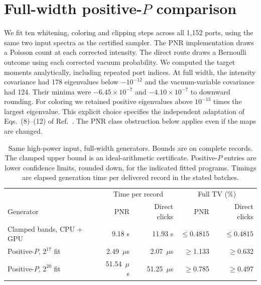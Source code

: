 \documentclass[11pt]{article}
\begin{document}
\section{Full-width positive-$P$ comparison}\label{sec:fullpositive}
We fit ten whitening, coloring and clipping steps across all 1,152 ports, using the same two input spectra as the certified sampler. The PNR implementation draws a Poisson count at each corrected intensity. The direct route draws a Bernoulli outcome using each corrected vacuum probability. We computed the target moments analytically, including repeated port indices. At full width, the intensity covariance had 178 eigenvalues below $-10^{-12}$ and the vacuum-variable covariance had 124. Their minima were $-6.45\times10^{-7}$ and $-4.10\times10^{-7}$ to downward rounding. For coloring we retained positive eigenvalues above $10^{-13}$ times the largest eigenvalue. This explicit choice specifies the independent adaptation of Eqs.~(8)--(12) of Ref.~\cite{goodman}. The PNR class obstruction below applies even if the maps are changed.

\begin{table}[ht]
\centering\small
\caption{Same high-power input, full-width generators. Bounds are on complete records. The clamped upper bound is an ideal-arithmetic certificate. Positive-$P$ entries are lower confidence limits, rounded down, for the indicated fitted programs. Timings are elapsed generation time per delivered record in the stated batches.}
\begin{tabular}{lrrrr}
\toprule
& \multicolumn{2}{c}{Time per record} & \multicolumn{2}{c}{Full TV (\%)}\\
Generator & PNR & Direct clicks & PNR & Direct clicks\\
\midrule
Clamped bands, CPU + GPU & 9.18 s & 11.93 s & $\le0.4815$ & $\le0.4815$\\
Positive-$P$, $2^{17}$ fit & 2.49~$\mu$s & 2.07~$\mu$s & $\ge$1.133 & $\ge$0.632\\
Positive-$P$, $2^{20}$ fit & 51.54~$\mu$s & 51.25~$\mu$s & $\ge$0.785 & $\ge$0.497\\
\bottomrule
\end{tabular}
\label{tab:fullpositive}
\end{table}
\end{document}
